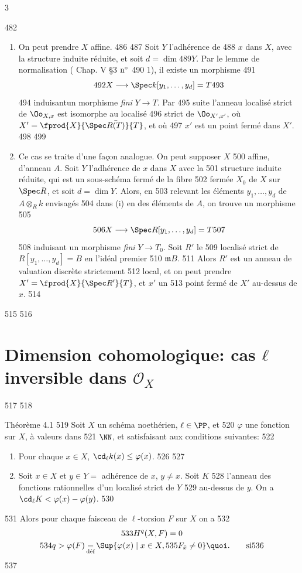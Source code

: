 3	\documentclass[10pt]{../fichiers-configuration-latex/smfart}
\begin{document}
   482	\begin{enumerate}
   483	\renewcommand{\theenumi}{\roman{enumi}}
   484	\renewcommand{\labelenumi}{(\theenumi)}
   485	\item On peut prendre $X$ affine. 
   486	
   487	Soit $Y$ l'adhérence de
   488	$x$ dans $X$, avec la structure induite réduite, et soit $d=\dim
   489	Y$. Par le lemme de normalisation (\cite{2} Chap. V \S 3 ${\rm n^{\circ}}$
   490	1), il existe un morphisme
   491	$$
   492	X\longrightarrow \Spec k[y_1,\ldots, y_d]=T
   493	$$
   494	induisant\pageoriginale un morphisme \emph{fini} $Y\rightarrow T$. Par
   495	suite l'anneau localisé strict de $\Oo_{X,x}$ est isomorphe au localisé
   496	strict de $\Oo_{X',x'}$, où $X'=\fprod{X}{\Spec\bar{R(T)}}{T}$, et où
   497	$x'$ est un point fermé dans $X'$.
   498	
   499	\item Ce cas se traite d'une façon analogue. On peut supposer $X$
   500	  affine, d'anneau $A$. Soit $Y$ l'adhérence de $x$ dans $X$ avec la
   501	  structure induite réduite, qui est un sous-schéma fermé de la fibre
   502	  fermée $X_0$ de $X$ sur $\Spec R$, et soit $d=\dim Y$. Alors, en
   503	  relevant les éléments $y_1,\ldots,y_d$ de $A\otimes_R k$ envisagés
   504	  dans (i) en des éléments de $A$, on trouve un morphisme
   505	$$
   506	X\longrightarrow \Spec R[y_1,\ldots,y_d]=T
   507	$$
   508	induisant un morphisme \emph{fini} $Y\rightarrow T_0$. Soit $R'$ le
   509	localisé strict de $R[y_1,\ldots,y_d]=B$ en l'idéal premier
   510	$𝔪B$. %
   511	Alors $R'$ est un anneau de valuation discrète strictement
   512	local, et on peut prendre $X'=\fprod{X}{\Spec R'}{T}$, et $x'$ un
   513	point fermé de $X'$ au-dessus de $x$.
   514	\end{enumerate}
   515	
   516	\section{Dimension cohomologique: cas $ℓ$ inversible dans $𝒪_X$}
   517	
   518	\begin{enonce*}{Théorème 4.1}
   519	Soit $X$ un schéma noethérien, $\ell\in \PP$, et
   520	$\varphi$ une fonction sur $X$, à valeurs dans
   521	$\NN$, et satisfaisant aux conditions suivantes:
   522	\begin{enumerate}
   523	\renewcommand{\theenumi}{\roman{enumi}}
   524	\renewcommand{\labelenumi}{(\theenumi)}
   525	\item Pour chaque $x\in X$, $\cd_{\ell}k(x)\leq \varphi (x)$.
   526	
   527	\item Soit $x\in X$ et $y\in Y=$ adhérence de $x$, $y\neq x$. Soit $K$
   528	  l'anneau des fonctions rationnelles d'un localisé strict de $Y$
   529	  au-dessus de $y$. On a $\cd_{\ell}K<\varphi(x)-\varphi(y)$.
   530	\end{enumerate}
   531	Alors pour chaque faisceau de $\ell$-torsion $F$ sur $X$ on a
   532	\begin{gather*}
   533	H^q(X,F)=0\\
   534	q>\varphi(F)\mathop{=}_{\text{\rm déf}}\Sup\{\varphi(x)\mid x\in X,
   535	F_{\bar{x}}\neq 0\}{\quoi}.\tag*{si}
   536	\end{gather*}
   537	\end{enonce*}
\end{document}
